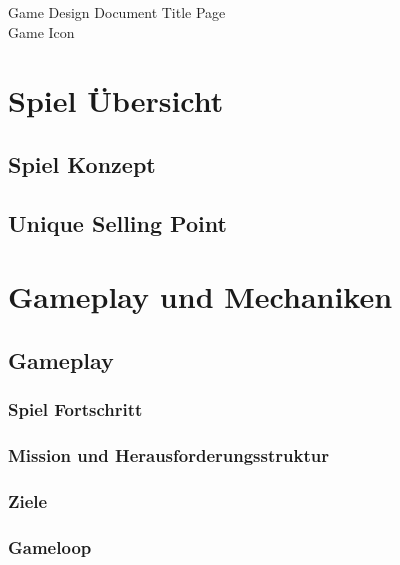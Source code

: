 \documentclass[envcountsame,envcountchap deutsch]{i-studis}
\begin{document}
\begin{titlepage}
Game Design Document Title Page
\\
Game Icon
\end{titlepage}


\tableofcontents										%

\chapter{Spiel Übersicht}
	\section{Spiel Konzept}
	\section{Unique Selling Point}
\chapter{Gameplay und Mechaniken}
	\section{Gameplay}
		\subsection{Spiel Fortschritt}
		\subsection{Mission und Herausforderungsstruktur}
		\subsection{Ziele} %
		\subsection{Gameloop}
\end{document}

